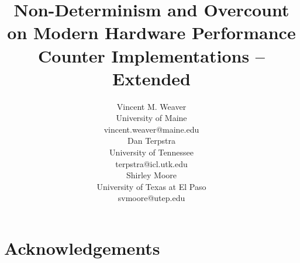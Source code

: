 \documentclass[10pt]{article}
\begin{document}
\title{Non-Determinism and Overcount on 
Modern Hardware Performance Counter Implementations -- Extended}

\author{Vincent M. Weaver\\
University of Maine\\
vincent.weaver@maine.edu\\[2ex]
Dan Terpstra\\
University of Tennessee\\
terpstra@icl.utk.edu\\[2ex]
Shirley Moore\\
University of Texas at El Paso\\
svmoore@utep.edu\\
}

\maketitle

\thispagestyle{firststyle}

\pagebreak

\begin{abstract}

\end{abstract}













\section*{Acknowledgements}


%
%


\end{document}
